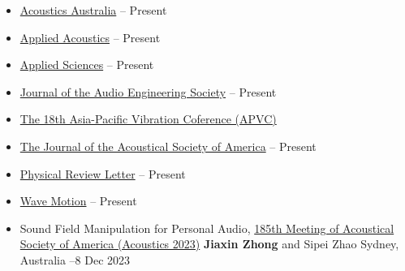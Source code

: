 \documentclass[10pt,a4paper,ragged2e,withhyper]{altacv}
\newcommand{\hrefhl}[2]{{\color{accent}\href{#1}{#2}}}
\begin{document}
\begin{itemize}
    \item \hrefhl{https://link.springer.com/journal/40857}{Acoustics Australia} \hfill {} -- Present

    \item \hrefhl{https://www.journals.elsevier.com/applied-acoustics}{Applied Acoustics} \hfill {} -- Present

    \item \hrefhl{https://www.mdpi.com/journal/applsci}{Applied Sciences} \hfill {} -- Present

    \item \hrefhl{https://www.aes.org/journal/}{Journal of the Audio Engineering Society} \hfill {} -- Present

    \item \hrefhl{https://www.amazon.com/Vibration-Engineering-Sustainable-Future-Passive/dp/3030476170}{The 18th Asia-Pacific Vibration Coference (APVC)} \hfill {}
    \item \hrefhl{https://asa.scitation.org/journal/jas}{The Journal of the Acoustical Society of America} \hfill {} -- Present

    \item \hrefhl{https://journals.aps.org/prl/}{Physical Review Letter} \hfill {} -- Present

    \item \hrefhl{https://www.sciencedirect.com/journal/wave-motion}{Wave Motion} \hfill {} -- Present

\end{itemize}

\begin{itemize}
    \item
          Sound Field Manipulation for Personal Audio,
          \hrefhl{https://acoustics23sydney.org/}{185th Meeting of
              Acoustical Society of America (Acoustics 2023)} \linebreak
          \faChair \textbf{Jiaxin Zhong} and Sipei Zhao \href{https://scholar.google.com/citations?hl=en&user=WcFvtugAAAAJ}{\color{accent}\aiGoogleScholarSquare}\href{https://profiles.uts.edu.au/Sipei.Zhao}{\color{accent}\faGlobe}
          \hfill \faMapMarker Sydney, Australia  --8 Dec 2023
\end{itemize}

\end{document}
